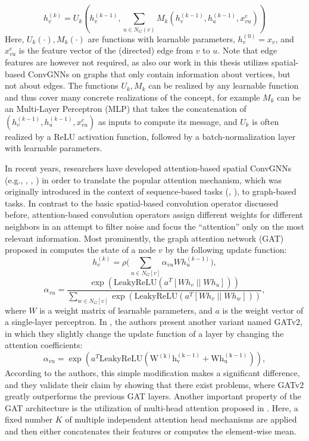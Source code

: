 \documentclass[draft,final]{vutinfth} %
\begin{document}
\[
    h_v^{(k)} = U_k (h_v^{(k-1)}, \sum_{u \in N_G(v)} M_k(h_v^{(k-1)}, h_u^{(k-1)}, x_{vu}^{e}))
\]
Here, $U_k(\cdot), M_k(\cdot)$ are functions with learnable parameters, $h_v^{(0)} = x_v$, and $x_{vu}^{e}$ is the feature vector of the (directed) edge from $v$ to $u$. Note that edge features are however not required, as also our work in this thesis utilizes spatial-based ConvGNNs on graphs that only contain information about vertices, but not about edges. 
The functions $U_k, M_k$ can be realized by any learnable function and thus cover many concrete realizations of the concept, for example $M_k$ can be an Multi-Layer Perceptron (MLP) that takes the concatenation of $(h_v^{(k-1)}, h_u^{(k-1)}, x_{vu}^{e})$ as inputs to compute its message, and $U_k$ is often realized by a ReLU activation function, followed by a batch-normalization \cite{IoffeS15} layer with learnable parameters. 

In recent years, researchers have developed attention-based spatial ConvGNNs (e.g., \cite{Velickovic2018}, \cite{Zhang2018}, \cite{Brody2021}) in order to translate the popular attention mechanism, which was originally introduced in the context of sequence-based tasks (\cite{Bahdanau2015}, \cite{VaswaniSPUJGKP17}), to graph-based tasks. In contrast to the basic spatial-based convolution operator discussed before, attention-based convolution operators assign different weights for different neighbors in an attempt to filter noise and focus the ``attention'' only on the most relevant information. 
Most prominently, the graph attention network (GAT) proposed in \cite{Velickovic2018} computes the state of a node $v$ by the following update function: 
\[
    h_v^{(k)} = \rho \big( \sum_{u \in N_G[v]} \alpha_{vu} W h_u^{(k-1)} \big),
\]
\[ 
    \alpha_{vu} = \frac{\exp(\mathrm{LeakyReLU}(a^T[Wh_v \; || \; Wh_u]))}{\sum_{w \in N_G[v]} \exp(\mathrm{LeakyReLU}(a^T[Wh_v \; ||\; Wh_w]))},
\]
where $W$ is a weight matrix of learnable parameters, and $a$ is the weight vector of a single-layer perceptron. 
In \cite{Brody2021}, the authors present another variant named GATv2, in which they slightly change the update function of a layer by changing the attention coefficients:  
\[
    \alpha_{vu} = \exp(a^T \mathrm{LeakyReLU(W^{(k)}h_v^{(k-1)} + W h_u^{(k-1)} )}),    
\]
According to the authors, this simple modification makes a significant difference, and they validate their claim by showing that there exist problems, where GATv2 greatly outperforms the previous GAT layers. 
Another important property of the GAT architecture is the utilization of multi-head attention proposed in \cite{VaswaniSPUJGKP17}. 
Here, a fixed number $K$ of multiple independent attention head mechanisms are applied and then either concatenates their features or computes the element-wise mean. 
\end{document}

